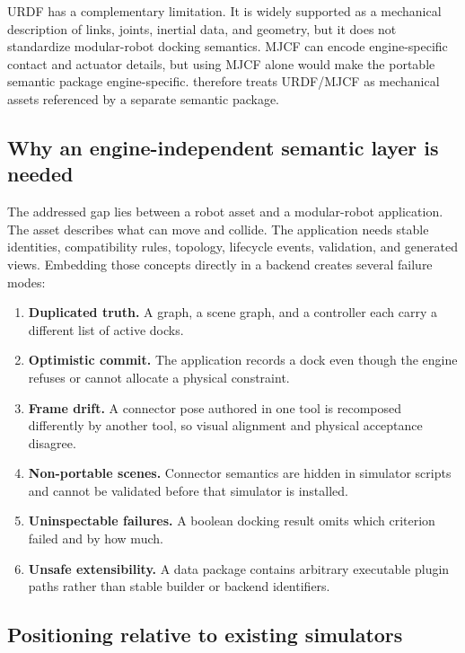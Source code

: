 URDF has a complementary limitation. It is widely supported as a mechanical
description of links, joints, inertial data, and geometry, but it does not standardize
modular-robot docking semantics. MJCF can encode engine-specific contact and actuator
details, but using MJCF alone would make the portable semantic package engine-specific.
\modsim{} therefore treats URDF/MJCF as mechanical assets referenced by a separate
semantic package.

\subsection{Why an engine-independent semantic layer is needed}

The addressed gap lies between a robot asset and a modular-robot application. The asset
describes what can move and collide. The application needs stable identities,
compatibility rules, topology, lifecycle events, validation, and generated views.
Embedding those concepts directly in a backend creates several failure modes:

\begin{enumerate}
  \item \textbf{Duplicated truth.} A graph, a scene graph, and a controller each carry a
        different list of active docks.
  \item \textbf{Optimistic commit.} The application records a dock even though the
        engine refuses or cannot allocate a physical constraint.
  \item \textbf{Frame drift.} A connector pose authored in one tool is recomposed
        differently by another tool, so visual alignment and physical acceptance
        disagree.
  \item \textbf{Non-portable scenes.} Connector semantics are hidden in simulator
        scripts and cannot be validated before that simulator is installed.
  \item \textbf{Uninspectable failures.} A boolean docking result omits which criterion
        failed and by how much.
  \item \textbf{Unsafe extensibility.} A data package contains arbitrary executable
        plugin paths rather than stable builder or backend identifiers.
\end{enumerate}

\subsection{Positioning relative to existing simulators}

